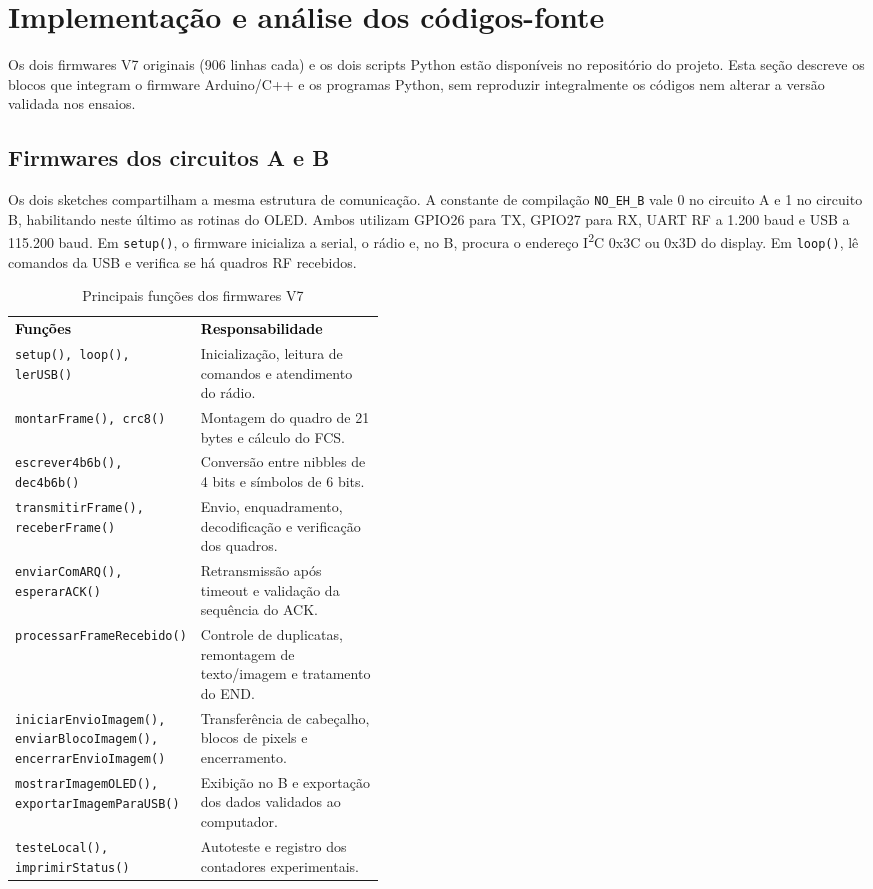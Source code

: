 \section{Implementação e análise dos códigos-fonte}
\label{sec:implementacao}
Os dois firmwares V7 originais (906 linhas cada) e os dois scripts Python estão disponíveis no repositório do projeto. Esta seção descreve os blocos que integram o firmware Arduino/C++ e os programas Python, sem reproduzir integralmente os códigos nem alterar a versão validada nos ensaios.

\subsection{Firmwares dos circuitos A e B}
Os dois sketches compartilham a mesma estrutura de comunicação. A constante de compilação \texttt{NO\_EH\_B} vale 0 no circuito A e 1 no circuito B, habilitando neste último as rotinas do OLED. Ambos utilizam GPIO26 para TX, GPIO27 para RX, UART RF a 1.200 baud e USB a 115.200 baud. Em \texttt{setup()}, o firmware inicializa a serial, o rádio e, no B, procura o endereço I\textsuperscript{2}C 0x3C ou 0x3D do display. Em \texttt{loop()}, lê comandos da USB e verifica se há quadros RF recebidos.

\begin{table}[H]\centering\small\caption{Principais funções dos firmwares V7}\label{tab:funcoes-firmware}
\begin{tabularx}{\linewidth}{>{\raggedright\arraybackslash}p{0.43\linewidth}X}
\rowcolor{tcdtablehead}\textcolor{black}{\textbf{Funções}} & \textcolor{black}{\textbf{Responsabilidade}}\\
\texttt{setup(), loop(), lerUSB()} & Inicialização, leitura de comandos e atendimento do rádio.\\
\texttt{montarFrame(), crc8()} & Montagem do quadro de 21 bytes e cálculo do FCS.\\
\texttt{escrever4b6b(), dec4b6b()} & Conversão entre nibbles de 4 bits e símbolos de 6 bits.\\
\texttt{transmitirFrame(), receberFrame()} & Envio, enquadramento, decodificação e verificação dos quadros.\\
\texttt{enviarComARQ(), esperarACK()} & Retransmissão após timeout e validação da sequência do ACK.\\
\texttt{processarFrameRecebido()} & Controle de duplicatas, remontagem de texto/imagem e tratamento do END.\\
\texttt{iniciarEnvioImagem(), enviarBlocoImagem(), encerrarEnvioImagem()} & Transferência de cabeçalho, blocos de pixels e encerramento.\\
\texttt{mostrarImagemOLED(), exportarImagemParaUSB()} & Exibição no B e exportação dos dados validados ao computador.\\
\texttt{testeLocal(), imprimirStatus()} & Autoteste e registro dos contadores experimentais.\\
\bottomrule\end{tabularx}\end{table}

